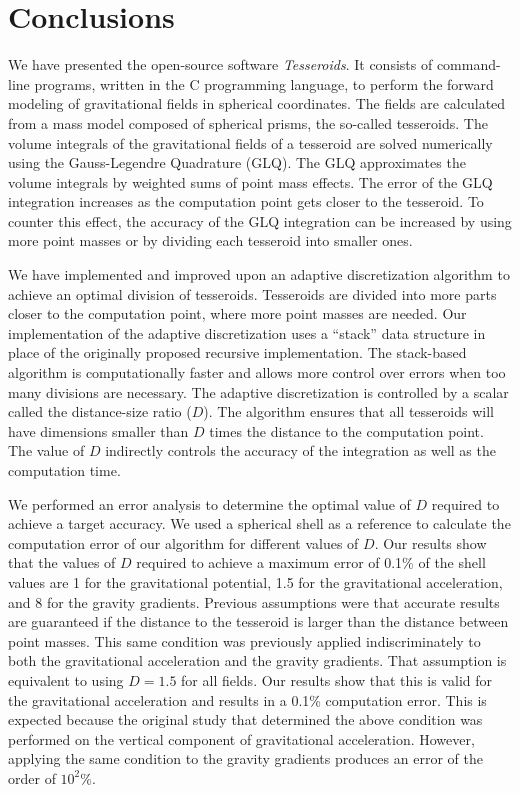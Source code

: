 \documentclass[paper,twocolumn,twoside]{geophysics}
\begin{document}
\section{Conclusions}

We have presented the open-source software \emph{Tesseroids}.
It consists of command-line programs,
written in the C programming language,
to perform the forward modeling of gravitational fields in spherical
coordinates.
The fields are calculated from a mass model composed of spherical prisms, the
so-called tesseroids.
The volume integrals of the gravitational fields of a tesseroid are solved
numerically using the Gauss-Legendre Quadrature (GLQ).
The GLQ approximates the volume integrals by weighted sums of point mass
effects.
The error of the GLQ integration increases as the computation point gets closer
to the tesseroid.
To counter this effect,
the accuracy of the GLQ integration can be increased by using more point
masses or by dividing each tesseroid into smaller ones.


We have implemented and improved upon an adaptive discretization algorithm to
achieve an optimal division of tesseroids.
Tesseroids are divided into more parts closer to the computation point,
where more point masses are needed.
Our implementation of the adaptive discretization uses a ``stack'' data
structure in place of the originally proposed recursive implementation.
The stack-based algorithm is computationally faster and allows more control
over errors when too many divisions are necessary.
The adaptive discretization is controlled by
a scalar called the distance-size ratio ($D$).
The algorithm ensures that all tesseroids will
have dimensions smaller than $D$ times the distance to the computation point.
The value of $D$ indirectly controls the accuracy of the integration as well as
the computation time.


We performed an error analysis to determine
the optimal value of $D$ required to achieve a target accuracy.
We used a spherical shell as a reference to calculate the computation error of
our algorithm for different values of $D$.
Our results show that the values of $D$ required to achieve a maximum error
of 0.1\% of the shell values are
1 for the gravitational potential, 1.5 for the gravitational acceleration,
and 8 for the gravity gradients.
Previous assumptions were that accurate results are guaranteed if
the distance to the tesseroid is larger than
the distance between point masses.
This same condition was previously applied indiscriminately
to both the gravitational acceleration and the gravity gradients.
That assumption is equivalent to using $D=1.5$ for all fields.
Our results show that this is valid for the gravitational
acceleration and results in a 0.1\% computation error.
This is expected because the original study that determined the above condition
was performed on the vertical component of gravitational acceleration.
However, applying the same condition to the gravity gradients produces
an error of the order of $10^2\%$.
\end{document}
